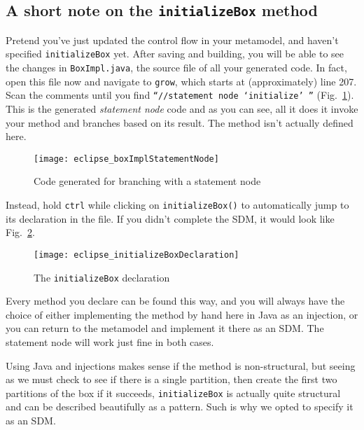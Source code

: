 \newpage
\hypertarget{initialize notes}{}
\subsection{A short note on the \texttt{initializeBox} method}
\genHeader

Pretend you've just updated the control flow in your metamodel, and haven't specified \texttt{initializeBox} yet. After saving and building, you will be able
to see the changes in \texttt{BoxImpl.java}, the source file of all your generated code. In fact, open this file now and navigate to \texttt{grow}, which
starts at (approximately) line 207. Scan the comments until you find \texttt{``//statement node `initialize' ''} (Fig.~\ref{fig:initBoxImpl}). This is the generated
\emph{statement node} code and as you can see, all it does it invoke your method and branches based on its result. The method isn't actually defined here.

\begin{figure}[htp]
\begin{center}
  \texttt{[image: eclipse\_boxImplStatementNode]}
  \caption{Code generated for branching with a statement node}
  \label{fig:initBoxImpl}
\end{center}
\end{figure}

Instead, hold \texttt{ctrl} while clicking on \texttt{initializeBox()} to automatically jump to its declaration in the file. If you didn't complete the SDM, it
would look like Fig.~\ref{fig:initBoxDecl}.

\begin{figure}[htp]
\begin{center}
  \texttt{[image: eclipse\_initializeBoxDeclaration]}
  \caption{The \texttt{initializeBox} declaration}
  \label{fig:initBoxDecl}
\end{center}
\end{figure}

Every method you declare can be found this way, and you will always have the choice of either implementing the method by hand here
in Java as an injection, or you can return to the metamodel and implement it there as an SDM. The statement node will work just fine in both cases. 

Using Java and injections makes sense if the method is non-structural, but seeing as we must check to see if there is a single partition, then create the
first two partitions of the box if it succeeds, \texttt{initializeBox} is actually quite structural and can be described beautifully as a pattern. Such is why
we opted to specify it as an SDM.

